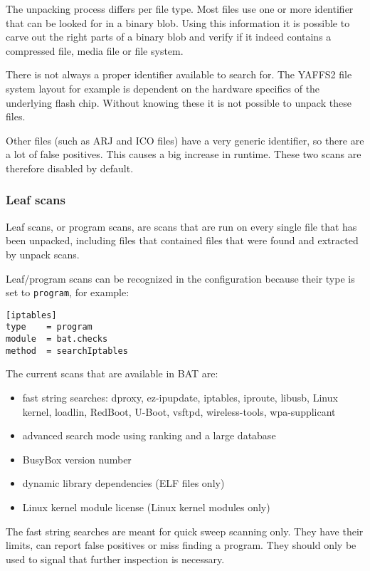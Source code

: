 \documentclass[10pt]{article}
\begin{document}
The unpacking process differs per file type. Most files use one or more
identifier that can be looked for in a binary blob. Using this information it
is possible to carve out the right parts of a binary blob and verify if it
indeed contains a compressed file, media file or file system.

There is not always a proper identifier available to search for. The YAFFS2
file system layout for example is dependent on the hardware specifics of the
underlying flash chip. Without knowing these it is not possible to unpack these
files.

Other files (such as ARJ and ICO files) have a very generic identifier, so
there are a lot of false positives. This causes a big increase in runtime.
These two scans are therefore disabled by default.

\subsubsection{Leaf scans}

Leaf scans, or program scans, are scans that are run on every single file
that has been unpacked, including files that contained files that were found
and extracted by unpack scans.

Leaf/program scans can be recognized in the configuration because their type is
set to \texttt{program}, for example:

\begin{verbatim}
[iptables]
type    = program
module  = bat.checks
method  = searchIptables
\end{verbatim}

The current scans that are available in BAT are:

\begin{itemize}
\item fast string searches: dproxy, ez-ipupdate, iptables, iproute, libusb,
Linux kernel, loadlin, RedBoot, U-Boot, vsftpd, wireless-tools, wpa-supplicant
\item advanced search mode using ranking and a large database
\item BusyBox version number
\item dynamic library dependencies (ELF files only)
\item Linux kernel module license (Linux kernel modules only)
\end{itemize}

The fast string searches are meant for quick sweep scanning only. They have
their limits, can report false positives or miss finding a program. They should
only be used to signal that further inspection is necessary.
\end{document}
